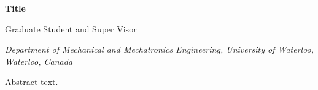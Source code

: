 \documentclass[11pt]{article}
\begin{document}

\vspace{-0.8cm}
\begin{flushleft}
\noindent
\Large \textbf{Title}
\vspace{0.5cm}

\normalsize{Graduate Student and Super Visor} \\
\vspace{5mm}

\textit{\footnotesize
Department of Mechanical and Mechatronics Engineering, University of Waterloo, Waterloo, Canada\\
}
\end{flushleft}

Abstract text.
 
\end{document}
